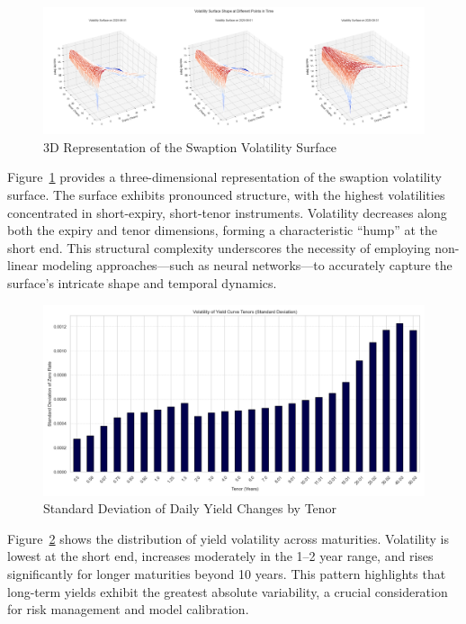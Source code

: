 \begin{figure}[H]
	\centering
	\includegraphics[width=1\textwidth]{images/descriptive_data_analysis/vol_surface_3d_snapshots.png}
	\caption{3D Representation of the Swaption Volatility Surface}
	\label{fig:vol_surface_3d_snapshots}
\end{figure}

Figure~\ref{fig:vol_surface_3d_snapshots} provides a three-dimensional representation of the swaption volatility surface. The surface exhibits pronounced structure, with the highest volatilities concentrated in short-expiry, short-tenor instruments. Volatility decreases along both the expiry and tenor dimensions, forming a characteristic “hump” at the short end. This structural complexity underscores the necessity of employing non-linear modeling approaches—such as neural networks—to accurately capture the surface’s intricate shape and temporal dynamics.

\begin{figure}[H]
	\centering
	\includegraphics[width=1\textwidth]{images/descriptive_data_analysis/yield_curve_std_by_tenor.png}
	\caption{Standard Deviation of Daily Yield Changes by Tenor}
	\label{fig:yield_curve_std_by_tenor}
\end{figure}

Figure~\ref{fig:yield_curve_std_by_tenor} shows the distribution of yield volatility across maturities. Volatility is lowest at the short end, increases moderately in the 1–2 year range, and rises significantly for longer maturities beyond 10 years. This pattern highlights that long-term yields exhibit the greatest absolute variability, a crucial consideration for risk management and model calibration.

